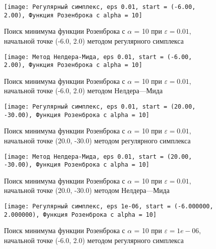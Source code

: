            \begin{figure}[H]
	        \centering
	        \texttt{[image: Регулярный симплекс, eps 0.01, start = (-6.00, 2.00), Функция Розенброка с alpha = 10]}%
	        \caption{Поиск минимума функции Розенброка с $\alpha$ = 10 при $\varepsilon = 0.01$, начальной точке (-6.0, 2.0) методом регулярного симплекса}
	        \vspace*{-1.2cm}
            \end{figure}
            
            \begin{figure}[H]
	        \centering
	        \texttt{[image: Метод Нелдера-Мида, eps 0.01, start = (-6.00, 2.00), Функция Розенброка с alpha = 10]}%
	        \caption{Поиск минимума функции Розенброка с $\alpha$ = 10 при $\varepsilon = 0.01$, начальной точке (-6.0, 2.0) методом Нелдера---Мида}
	        \vspace*{-1.2cm}
            \end{figure}
            
            \begin{figure}[H]
	        \centering
	        \texttt{[image: Регулярный симплекс, eps 0.01, start = (20.00, -30.00), Функция Розенброка с alpha = 10]}%
	        \caption{Поиск минимума функции Розенброка с $\alpha$ = 10 при $\varepsilon = 0.01$, начальной точке (20.0, -30.0) методом регулярного симплекса}
	        \vspace*{-1.2cm}
            \end{figure}
            
            \begin{figure}[H]
	        \centering
	        \texttt{[image: Метод Нелдера-Мида, eps 0.01, start = (20.00, -30.00), Функция Розенброка с alpha = 10]}%
	        \caption{Поиск минимума функции Розенброка с $\alpha$ = 10 при $\varepsilon = 0.01$, начальной точке (20.0, -30.0) методом Нелдера---Мида}
	        \vspace*{-1.2cm}
            \end{figure}
            
            \begin{figure}[H]
	        \centering
	        \texttt{[image: Регулярный симплекс, eps 1e-06, start = (-6.000000, 2.000000), Функция Розенброка с alpha = 10]}%
	        \caption{Поиск минимума функции Розенброка с $\alpha$ = 10 при $\varepsilon = 1e-06$, начальной точке (-6.0, 2.0) методом регулярного симплекса}
	        \vspace*{-1.2cm}
            \end{figure}
            
